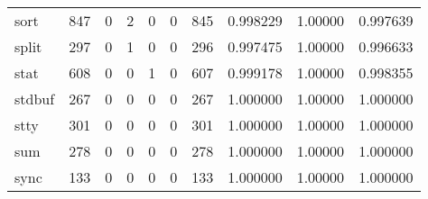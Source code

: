 \begin{tabular}{lrrrrrrrrr}
sort      &                    847 &                                  0 &                                 2 &                                0 &                                 0 &                             845 &                                0.998229 &                                1.00000 &                             0.997639 \\
split     &                    297 &                                  0 &                                 1 &                                0 &                                 0 &                             296 &                                0.997475 &                                1.00000 &                             0.996633 \\
stat      &                    608 &                                  0 &                                 0 &                                1 &                                 0 &                             607 &                                0.999178 &                                1.00000 &                             0.998355 \\
stdbuf    &                    267 &                                  0 &                                 0 &                                0 &                                 0 &                             267 &                                1.000000 &                                1.00000 &                             1.000000 \\
stty      &                    301 &                                  0 &                                 0 &                                0 &                                 0 &                             301 &                                1.000000 &                                1.00000 &                             1.000000 \\
sum       &                    278 &                                  0 &                                 0 &                                0 &                                 0 &                             278 &                                1.000000 &                                1.00000 &                             1.000000 \\
sync      &                    133 &                                  0 &                                 0 &                                0 &                                 0 &                             133 &                                1.000000 &                                1.00000 &                             1.000000 \\

\end{tabular}
